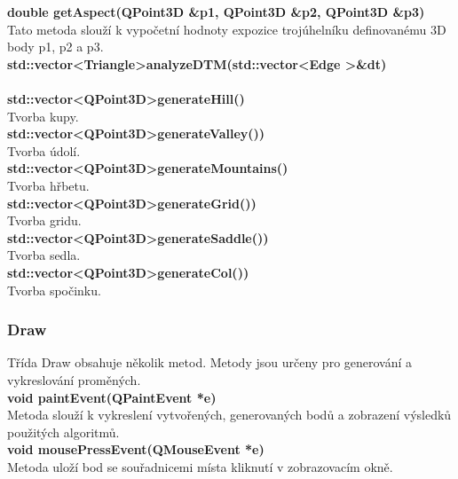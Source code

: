 \documentclass[a4paper, 12pt]{article}
\begin{document}
\textbf{double getAspect(QPoint3D \&p1, QPoint3D \&p2, QPoint3D \&p3)}\\
Tato metoda slouží k vypočetní hodnoty expozice trojúhelníku definovanému 3D body p1, p2 a p3.\\

\textbf{std::vector\textless Triangle\textgreater analyzeDTM(std::vector\textless Edge \textgreater \&dt)}\\
\\

\textbf{std::vector\textless QPoint3D\textgreater generateHill()}\\
Tvorba kupy.\\

\textbf{std::vector\textless QPoint3D\textgreater generateValley())}\\
Tvorba údolí.\\

\textbf{std::vector\textless QPoint3D\textgreater generateMountains()}\\
Tvorba hřbetu.\\

\textbf{std::vector\textless QPoint3D\textgreater generateGrid())}\\
Tvorba gridu.\\

\textbf{std::vector\textless QPoint3D\textgreater generateSaddle())}\\
Tvorba sedla.\\

\textbf{std::vector\textless QPoint3D\textgreater generateCol())}\\
Tvorba spočinku.\\

\subsubsection{Draw}
Třída Draw obsahuje několik metod. Metody jsou určeny pro generování a vykreslování proměných.
\\

\textbf{void paintEvent(QPaintEvent *e)}\\
Metoda slouží k vykreslení vytvořených, generovaných bodů a zobrazení výsledků použitých algoritmů.
\\

\textbf{void mousePressEvent(QMouseEvent *e)}\\
Metoda uloží bod se souřadnicemi místa kliknutí v zobrazovacím okně.
\\
\end{document}
